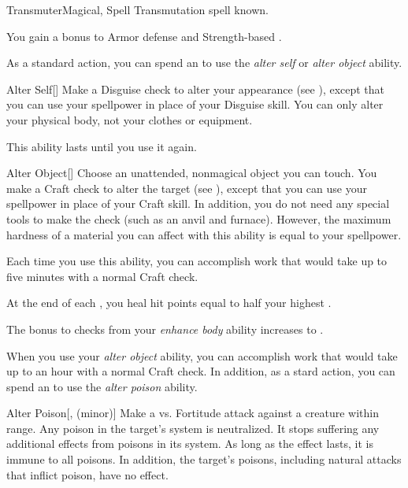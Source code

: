     \begin{feat}{Transmuter}{Magical, Spell}
        \featpre Transmutation spell known.

         You gain a  bonus to Armor defense and Strength-based .

         As a standard action, you can spend an  to use the \textit{alter self} or \textit{alter object} ability.
        \begin{ability}{Alter Self}[]
            Make a Disguise check to alter your appearance (see ), except that you can use your spellpower in place of your Disguise skill.
            You can only alter your physical body, not your clothes or equipment.

            This ability lasts until you use it again.
        \end{ability}

        \begin{ability}{Alter Object}[]
            Choose an unattended, nonmagical object you can touch.
            You make a Craft check to alter the target (see ), except that you can use your spellpower in place of your Craft skill.
            In addition, you do not need any special tools to make the check (such as an anvil and furnace).
            However, the maximum hardness of a material you can affect with this ability is equal to your spellpower.

            Each time you use this ability, you can accomplish work that would take up to five minutes with a normal Craft check.
        \end{ability}

         At the end of each , you heal hit points equal to half your highest .

         The bonus to checks from your \textit{enhance body} ability increases to .

         When you use your \textit{alter object} ability, you can accomplish work that would take up to an hour with a normal Craft check.
        In addition, as a stard action, you can spend an  to use the \textit{alter poison} ability.
        \begin{ability}{Alter Poison}[,  (minor)]
            Make a  vs. Fortitude attack against a creature within \rngclose range.
            \hit Any poison in the target's system is neutralized.
            It stops suffering any additional effects from poisons in its system.
            As long as the effect lasts, it is immune to all poisons.
            In addition, the target's  poisons, including natural attacks that inflict poison, have no effect.
        \end{ability}


\end{feat}

